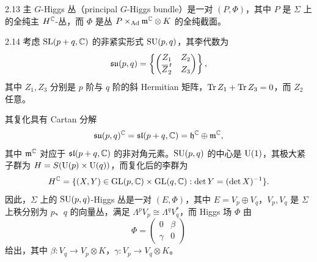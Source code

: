 
\begin{defn}{2.13} 主 $G$-Higgs 丛（principal $G$-Higgs bundle）是一对 $(P,\Phi)$，其中 $P$ 是 $\Sigma$ 上的全纯主 $H^{\mathbb{C}}$-丛，而 $\Phi$ 是丛 $P\times_{\mathrm{Ad}}\mathfrak{m}^{\mathbb{C}}\otimes K$ 的全纯截面。\end{defn}


\begin{exmp}{2.14} 考虑 $\mathrm{SL}(p+q,\mathbb{C})$ 的非紧实形式 $\mathrm{SU}(p,q)$，其李代数为
\[
\mathfrak{su}(p,q)=\left\{\begin{pmatrix}Z_1&Z_2\\ \overline{Z}_2^{\,t}&Z_3\end{pmatrix}\right\},
\]
其中 $Z_1,Z_3$ 分别是 $p$ 阶与 $q$ 阶的斜 Hermitian 矩阵，$\operatorname{Tr} Z_1+\operatorname{Tr} Z_3=0$，而 $Z_2$ 任意。



其复化具有 Cartan 分解
\[
\mathfrak{su}(p,q)^{\mathbb{C}}=\mathfrak{sl}(p+q,\mathbb{C})=\mathfrak{h}^{\mathbb{C}}\oplus\mathfrak{m}^{\mathbb{C}},
\]
其中 $\mathfrak{m}^{\mathbb{C}}$ 对应于 $\mathfrak{sl}(p+q,\mathbb{C})$ 的非对角元素。$\mathrm{SU}(p,q)$ 的中心是 $\mathrm{U}(1)$，其极大紧子群为 $H=S(\mathrm{U}(p)\times\mathrm{U}(q))$，而复化后的李群为
\[
H^{\mathbb{C}}=\{(X,Y)\in\mathrm{GL}(p,\mathbb{C})\times\mathrm{GL}(q,\mathbb{C}): \det Y=(\det X)^{-1}\}.
\]
因此，$\Sigma$ 上的 $\mathrm{SU}(p,q)$-Higgs 丛是一对 $(E,\Phi)$，其中 $E=V_p\oplus V_q$，$V_p,V_q$ 是 $\Sigma$ 上秩分别为 $p$、$q$ 的向量丛，满足 $\Lambda^{p}V_p\cong\Lambda^{q}V_q^{*}$，而 Higgs 场 $\Phi$ 由
\[
\Phi=\begin{pmatrix}0&\beta\\ \gamma&0\end{pmatrix}
\]
给出，其中 $\beta: V_q\to V_p\otimes K$，$\gamma: V_p\to V_q\otimes K$。\end{exmp}

